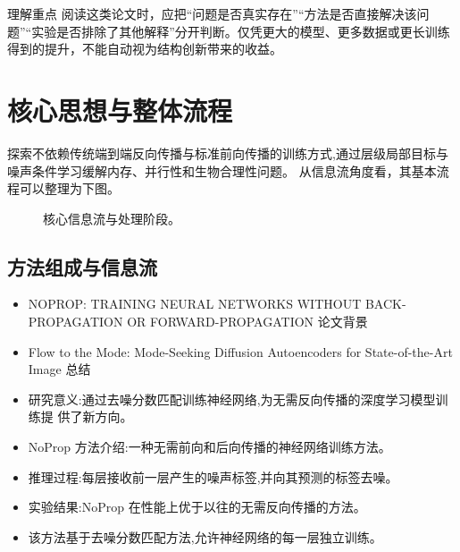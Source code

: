 \documentclass[UTF8,11pt,a4paper]{ctexart}
\begin{document}
\begin{notebox}{理解重点}
阅读这类论文时，应把“问题是否真实存在”“方法是否直接解决该问题”“实验是否排除了其他解释”分开判断。仅凭更大的模型、更多数据或更长训练得到的提升，不能自动视为结构创新带来的收益。
\end{notebox}

\section{核心思想与整体流程}
探索不依赖传统端到端反向传播与标准前向传播的训练方式,通过层级局部目标与噪声条件学习缓解内存、并行性和生物合理性问题。 从信息流角度看，其基本流程可以整理为下图。

\begin{figure}[H]
\centering
{}
\caption{核心信息流与处理阶段。}
\end{figure}

\subsection{方法组成与信息流}
\begin{itemize}
\item NOPROP: TRAINING NEURAL NETWORKS WITHOUT BACK-PROPAGATION OR FORWARD-PROPAGATION 论文背景
\item Flow to the Mode: Mode-Seeking Diffusion Autoencoders for State-of-the-Art Image 总结
\item 研究意义:通过去噪分数匹配训练神经网络,为无需反向传播的深度学习模型训练提 供了新方向。
\item NoProp 方法介绍:一种无需前向和后向传播的神经网络训练方法。
\item 推理过程:每层接收前一层产生的噪声标签,并向其预测的标签去噪。
\item 实验结果:NoProp 在性能上优于以往的无需反向传播的方法。
\item 该方法基于去噪分数匹配方法,允许神经网络的每一层独立训练。
\end{itemize}
\end{document}
